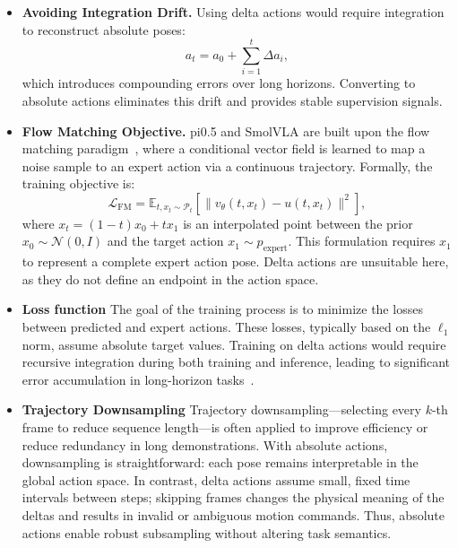 \documentclass[english,12pt,a4paper,pdftex,elec,utf8]{aaltothesis}
\begin{document}
\begin{itemize}
    \item \textbf{Avoiding Integration Drift.}
    Using delta actions would require integration to reconstruct absolute poses:
    \begin{equation}
        a_t = a_0 + \sum_{i=1}^{t} \Delta a_i,
        \label{eq:accumulation}
    \end{equation}
    which introduces compounding errors over long horizons. Converting to absolute actions eliminates this drift and provides stable supervision signals.

    \item \textbf{Flow Matching Objective.}
    pi0.5 and SmolVLA are built upon the flow matching paradigm~\cite{lipman2023flow}, where a conditional vector field is learned to map a noise sample to an expert action via a continuous trajectory. Formally, the training objective is:
    \[
    \mathcal{L}_{\text{FM}} = \mathbb{E}_{t, x_t \sim \mathcal{P}_t} \left[ \|v_\theta(t, x_t) - u(t, x_t)\|^2 \right],
    \]
    where \( x_t = (1 - t) x_0 + t x_1 \) is an interpolated point between the prior \( x_0 \sim \mathcal{N}(0, I) \) and the target action \( x_1 \sim p_{\text{expert}} \). This formulation requires \( x_1 \) to represent a complete expert action pose. Delta actions are unsuitable here, as they do not define an endpoint in the action space.

    \item \textbf{Loss function} The goal of the training process is to minimize the losses between predicted and expert actions. These losses, typically based on the $\ell_1$ norm, assume absolute target values. Training on delta actions would require recursive integration during both training and inference, leading to significant error accumulation in long-horizon tasks~\cite{lynch2020learning}.

    \item \textbf{Trajectory Downsampling} Trajectory downsampling—selecting every \( k \)-th frame to reduce sequence length—is often applied to improve efficiency or reduce redundancy in long demonstrations. With absolute actions, downsampling is straightforward: each pose remains interpretable in the global action space. In contrast, delta actions assume small, fixed time intervals between steps; skipping frames changes the physical meaning of the deltas and results in invalid or ambiguous motion commands. Thus, absolute actions enable robust subsampling without altering task semantics.


\end{itemize}
\end{document}
